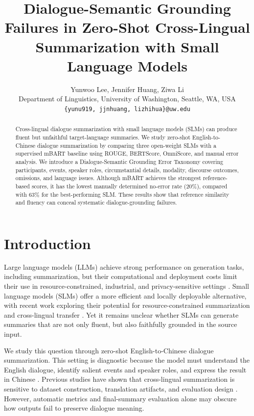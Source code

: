 \documentclass[11pt]{article}
\title{Dialogue-Semantic Grounding Failures in Zero-Shot Cross-Lingual Summarization with Small Language Models}
\author{
Yunwoo Lee, Jennifer Huang, Ziwa Li \\
Department of Linguistics, University of Washington, Seattle, WA, USA \\
\texttt{\{yunu919, jjnhuang, lizhihua\}@uw.edu}
}
\begin{document}
\maketitle
\begin{abstract}
Cross-lingual dialogue summarization with small language models (SLMs) can produce fluent but unfaithful target-language summaries. We study zero-shot English-to-Chinese dialogue summarization by comparing three open-weight SLMs with a supervised mBART baseline using ROUGE, BERTScore, OmniScore, and manual error analysis. We introduce a Dialogue-Semantic Grounding Error Taxonomy covering participants, events, speaker roles, circumstantial details, modality, discourse outcomes, omissions, and language issues. Although mBART achieves the strongest reference-based scores, it has the lowest manually determined no-error rate (20\%), compared with 63\% for the best-performing SLM. These results show that reference similarity and fluency can conceal systematic dialogue-grounding failures.
\end{abstract}

\section{Introduction}
Large language models (LLMs) achieve strong performance on generation tasks, including summarization, but their computational and deployment costs limit their use in resource-constrained, industrial, and privacy-sensitive settings \citep{abrougui-etal-2026-small,xu-etal-2025-evaluating}. Small language models (SLMs) offer a more efficient and locally deployable alternative, with recent work exploring their potential for resource-constrained summarization and cross-lingual transfer \citep{xu-etal-2025-evaluating,philippy-etal-2025-enhancing}. Yet it remains unclear whether SLMs can generate summaries that are not only fluent, but also faithfully grounded in the source input.

We study this question through zero-shot English-to-Chinese dialogue summarization. This setting is diagnostic because the model must understand the English dialogue, identify salient events and speaker roles, and express the result in Chinese \citep{wang-etal-2022-clidsum,wang-etal-2023-zero}. Previous studies have shown that cross-lingual summarization is sensitive to dataset construction, translation artifacts, and evaluation design \citep{bhattacharjee-etal-2023-crosssum,wang-etal-2023-understanding}. However, automatic metrics and final-summary evaluation alone may obscure how outputs fail to preserve dialogue meaning.
\end{document}
